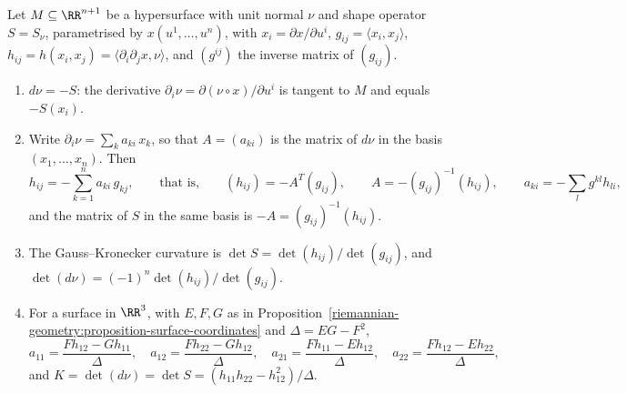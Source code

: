 \begin{proposition}\label{riemannian-geometry:proposition-weingarten-coordinates}
Let $M \subseteq \RR^{n+1}$ be a hypersurface with unit normal $\nu$ and shape operator $S = S_\nu$, parametrised by $x(u^1, \ldots, u^n)$, with $x_i = \partial x/\partial u^i$,
$g_{ij} = \langle x_i, x_j\rangle$, $h_{ij} = h(x_i, x_j) = \langle\partial_i\partial_jx, \nu\rangle$, and $(g^{ij})$ the inverse matrix of $(g_{ij})$.
\begin{enumerate}
\item $d\nu = -S$: the derivative $\partial_i\nu = \partial(\nu \circ x)/\partial u^i$ is tangent to $M$ and equals $-S(x_i)$.
\item Write $\partial_i\nu = \sum_ka_{ki}\,x_k$, so that $A = (a_{ki})$ is the matrix of $d\nu$ in the basis $(x_1, \ldots, x_n)$. Then
\[
h_{ij} = -\sum_{k=1}^na_{ki}\,g_{kj}, \qquad\text{that is,}\qquad (h_{ij}) = -A^T(g_{ij}), \qquad A = -(g_{ij})^{-1}(h_{ij}), \qquad a_{ki} = -\sum_lg^{kl}h_{li},
\]
and the matrix of $S$ in the same basis is $-A = (g_{ij})^{-1}(h_{ij})$.
\item The Gauss--Kronecker curvature is $\det S = \det(h_{ij})/\det(g_{ij})$, and $\det(d\nu) = (-1)^n\det(h_{ij})/\det(g_{ij})$.
\item For a surface in $\RR^3$, with $E, F, G$ as in Proposition~\ref{riemannian-geometry:proposition-surface-coordinates} and $\Delta = EG - F^2$,
\[
a_{11} = \frac{Fh_{12} - Gh_{11}}{\Delta}, \quad a_{12} = \frac{Fh_{22} - Gh_{12}}{\Delta}, \quad a_{21} = \frac{Fh_{11} - Eh_{12}}{\Delta}, \quad
a_{22} = \frac{Fh_{12} - Eh_{22}}{\Delta},
\]
and $K = \det(d\nu) = \det S = (h_{11}h_{22} - h_{12}^2)/\Delta$.
\end{enumerate}
\end{proposition}

